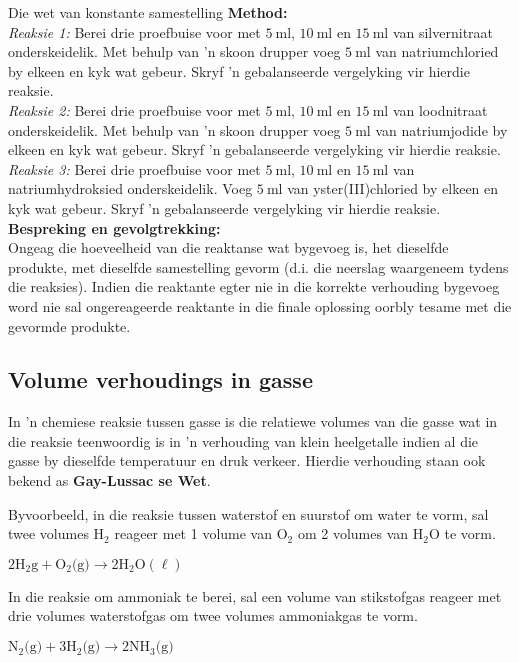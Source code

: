 \begin{Investigation}{Die wet van konstante samestelling}
\textbf{Method:}\\
\textsl{Reaksie 1:} Berei drie proefbuise voor met $5~\text{ml}$, $10~\text{ml}$ en $15~\text{ml}$ van silvernitraat onderskeidelik. Met behulp van 'n skoon drupper voeg $5~\text{ml}$ van natriumchloried by elkeen en kyk wat gebeur. Skryf 'n gebalanseerde vergelyking vir hierdie reaksie.\\
\textsl{Reaksie 2:} Berei drie proefbuise voor met $5~\text{ml}$, $10~\text{ml}$ en $15~\text{ml}$  van loodnitraat onderskeidelik. Met behulp van 'n skoon drupper voeg $5~\text{ml}$ van natriumjodide by elkeen en kyk wat gebeur. Skryf 'n gebalanseerde vergelyking vir hierdie reaksie.\\
\textsl{Reaksie 3:} Berei drie proefbuise voor met $5~\text{ml}$, $10~\text{ml}$ en $15~\text{ml}$  van natriumhydroksied onderskeidelik. Voeg $5~\text{ml}$ van yster(III)chloried by elkeen en kyk wat gebeur. Skryf 'n gebalanseerde vergelyking vir hierdie reaksie. \\
\textbf{Bespreking en gevolgtrekking:} \\
Ongeag die hoeveelheid van die reaktanse wat bygevoeg is, het dieselfde produkte, met dieselfde samestelling gevorm (d.i. die neerslag waargeneem tydens die reaksies). Indien die reaktante egter nie in die korrekte verhouding bygevoeg word nie sal ongereageerde reaktante in die finale oplossing oorbly tesame met die gevormde produkte.
\end{Investigation}

    \label{m38711*cid7}
            \subsection*{Volume verhoudings in gasse}
            \nopagebreak
      \label{m38711*id65179}In 'n chemiese reaksie tussen gasse is die relatiewe volumes van die gasse wat in die reaksie teenwoordig is in 'n verhouding van klein heelgetalle indien al die gasse by dieselfde temperatuur en druk verkeer. Hierdie verhouding staan ook bekend as \textbf{Gay-Lussac se Wet}.\par 
      \label{m38711*id65189}Byvoorbeeld, in die reaksie tussen waterstof en suurstof om water te vorm, sal twee volumes $\text{H}{}_{2}$ reageer met 1 volume van $\text{O}_{2}$ om 2 volumes van $\text{H}_{2}\text{O}$ te vorm.\par 
      \label{m38711*id65237}$2\text{H}_{2}\text{g} +\text{O}_{2} \text{(g)} \to 2\text{H}_{2}\text{O} (\ell)$\par 
      \label{m38711*id65282}In die reaksie om ammoniak te berei, sal een volume van stikstofgas reageer met drie volumes waterstofgas om twee volumes ammoniakgas te vorm.\par 
      \label{m38711*id65286}$\text{N}_{2} \text{(g)}+3\text{H}_{2} \text{(g)} \to 2\text{NH}_{3} \text{(g)}$
      \par  
    \label{m38711*cid8}

